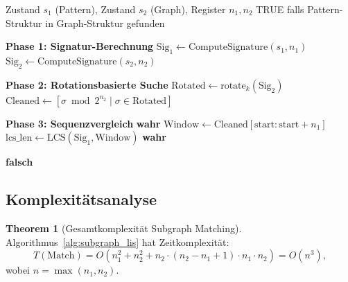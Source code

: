 \documentclass[a4paper,12pt]{article}
\theoremstyle{definition}
\newtheorem{theorem}{Theorem}
\begin{document}
\begin{algorithm}[H]
    \caption{Subgraph Matching für LIS$^{\infty}$-Zustände}
    \label{alg:subgraph_lis}
    \begin{algorithmic}[1]
        \Require Zustand $s_1$ (Pattern), Zustand $s_2$ (Graph), Register $n_1, n_2$
        \Ensure TRUE falls Pattern-Struktur in Graph-Struktur gefunden
        
        \Statex \textbf{Phase 1: Signatur-Berechnung}
        \State $\text{Sig}_1 \gets \text{ComputeSignature}(s_1, n_1)$ 
        \State $\text{Sig}_2 \gets \text{ComputeSignature}(s_2, n_2)$ 
        
        \Statex \textbf{Phase 2: Rotationsbasierte Suche}
         
            \State $\text{Rotated} \gets \text{rotate}_k(\text{Sig}_2)$
            \State $\text{Cleaned} \gets [\sigma \bmod 2^{n_2} \mid \sigma \in \text{Rotated}]$
            
            \Statex \textbf{Phase 3: Sequenzvergleich}
                 
                    \State \Return \textbf{wahr}
                \EndIf
            \Else {}
                 
                    \State $\text{Window} \gets \text{Cleaned}[\text{start}:\text{start}+n_1]$
                    \State $\text{lcs\_len} \gets \text{LCS}(\text{Sig}_1, \text{Window})$
                        \State \Return \textbf{wahr}
                    \EndIf
                \EndFor
            \EndIf
        \EndFor
        
        \State \Return \textbf{falsch}
    \end{algorithmic}
\end{algorithm}

\subsection{Komplexitätsanalyse}

\begin{theorem}[Gesamtkomplexität Subgraph Matching]
	\label{thm:subgraph_complexity}
	Algorithmus~\ref{alg:subgraph_lis} hat Zeitkomplexität:
	\[
	T(\text{Match}) = O(n_1^2 + n_2^2 + n_2 \cdot (n_2 - n_1 + 1) \cdot n_1 \cdot n_2) = O(n^3),
	\]
	wobei $n = \max(n_1, n_2)$.
\end{theorem}
\end{document}
